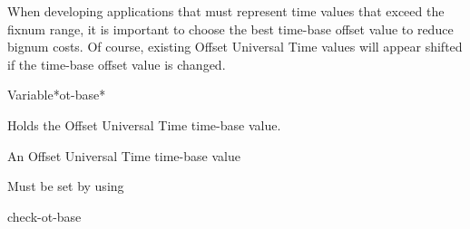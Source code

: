 \documentclass[10pt,twoside,english,pdftex]{article}
\begin{document}
When developing applications that must represent time values that
exceed the fixnum range, it is important to choose the best time-base
offset value to reduce bignum costs.  Of course, existing Offset
Universal Time values will appear shifted if the time-base offset
value is changed.

\W\entities
\T\clearpage


\begin{functiondoc}{Variable}{*ot-base*}{}%

\fnsyntax

\fnpurpose Holds the Offset Universal Time time-base value.

\fnpackage {} 

\fnmodule {}

\fnvaluetype An Offset Universal Time time-base value

\fninitialvalue Must be set by using 

\begin{alsos}{check-ot-base}
\also[ot2ut]
\also[ut2ot]
\end{alsos}

\end{functiondoc}

\end{document}
